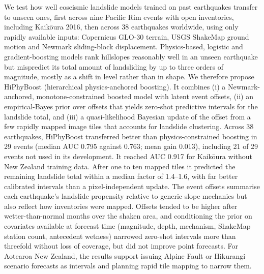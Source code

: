 We test how well coseismic landslide models trained on past earthquakes transfer to unseen ones, first across nine Pacific Rim events with open inventories, including Kaik\={o}ura 2016, then across 38 earthquakes worldwide, using only rapidly available inputs: Copernicus GLO-30 terrain, USGS ShakeMap ground motion and Newmark sliding-block displacement. Physics-based, logistic and gradient-boosting models rank hillslopes reasonably well in an unseen earthquake but mispredict its total amount of landsliding by up to three orders of magnitude, mostly as a shift in level rather than in shape. We therefore propose HiPhyBoost (hierarchical physics-anchored boosting). It combines (i) a Newmark-anchored, monotone-constrained boosted model with latent event offsets, (ii) an empirical-Bayes prior over offsets that yields zero-shot predictive intervals for the landslide total, and (iii) a quasi-likelihood Bayesian update of the offset from a few rapidly mapped image tiles that accounts for landslide clustering. Across 38 earthquakes, HiPhyBoost transferred better than physics-constrained boosting in 29 events (median AUC 0.795 against 0.763; mean gain 0.013), including 21 of 29 events not used in its development. It reached AUC 0.917 for Kaik\={o}ura without New Zealand training data. After one to ten mapped tiles it predicted the remaining landslide total within a median factor of 1.4--1.6, with far better calibrated intervals than a pixel-independent update. The event offsets summarise each earthquake's landslide propensity relative to generic slope mechanics but also reflect how inventories were mapped. Offsets tended to be higher after wetter-than-normal months over the shaken area, and conditioning the prior on covariates available at forecast time (magnitude, depth, mechanism, ShakeMap station count, antecedent wetness) narrowed zero-shot intervals more than threefold without loss of coverage, but did not improve point forecasts. For Aotearoa New Zealand, the results support issuing Alpine Fault or Hikurangi scenario forecasts as intervals and planning rapid tile mapping to narrow them.